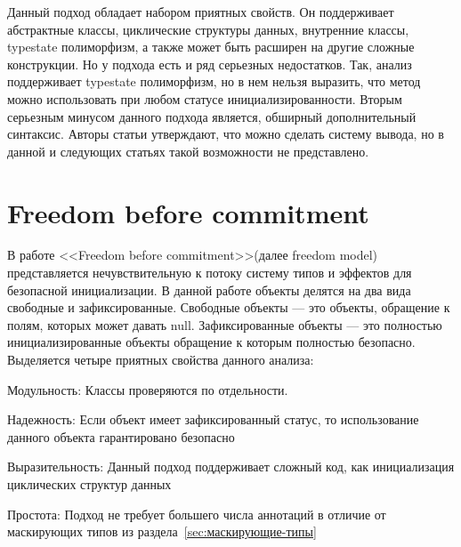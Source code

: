 Данный подход обладает набором приятных свойств.
Он поддерживает абстрактные классы, циклические структуры данных, внутренние классы, typestate полиморфизм,
а также может быть расширен на другие сложные конструкции.
Но у подхода есть и ряд серьезных недостатков.
Так, анализ поддерживает typestate полиморфизм, но в нем нельзя выразить,
что метод можно использовать при любом статусе инициализированности.
Вторым серьезным минусом данного подхода является, обширный дополнительный синтаксис.
Авторы статьи утверждают, что можно сделать систему вывода, но в данной и следующих статьях такой возможности не представлено.


\section{Freedom before commitment}\label{sec:the-freedom-model}

В работе <<Freedom before commitment>>(далее freedom model)\cite{the-freedom-model} представляется нечувствительную к потоку
систему типов и эффектов для безопасной инициализации.
В данной работе объекты делятся на два вида свободные и зафиксированные.
Свободные объекты --- это объекты, обращение к полям, которых может давать null.
Зафиксированные объекты --- это полностью инициализированные объекты обращение к которым полностью безопасно.
Выделяется четыре приятных свойства данного анализа:
\begin{itemize*}
    \item Модульность: Классы проверяются по отдельности.
    \item Надежность: Если объект имеет зафиксированный статус, то использование данного объекта гарантировано безопасно
    \item Выразительность: Данный подход поддерживает сложный код, как инициализация циклических структур данных
    \item Простота: Подход не требует большего числа аннотаций в отличие от маскирующих типов из раздела~\ref{sec:маскирующие-типы}
\end{itemize*}

